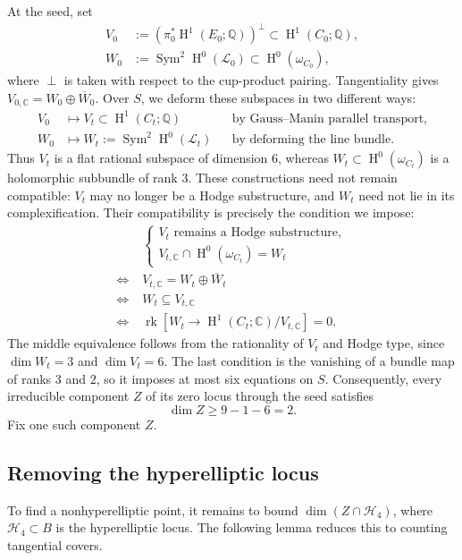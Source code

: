 \documentclass{amsart}
\DeclareMathOperator{\Sym}{Sym}
\DeclareMathOperator{\Hnm}{H}
\DeclareMathOperator{\rk}{rk}
\begin{document}
At the seed, set
$$
\begin{aligned}
V_0&:=\left(\pi_0^*\Hnm^1(E_0;\mathbb{Q})\right)^\perp
\subset\Hnm^1(C_0;\mathbb{Q}),\\
W_0&:=\Sym^2\Hnm^0(\mathcal{L}_0)\subset\Hnm^0(\omega_{C_0}),
\end{aligned}
$$
where $\perp$ is taken with respect to the cup-product pairing.
Tangentiality gives $V_{0,\mathbb{C}}=W_0\oplus\overline{W}_0$.
Over $S$, we deform these subspaces in two different ways:
$$
\begin{aligned}
V_0&\longmapsto V_t\subset\Hnm^1(C_t;\mathbb{Q})
&&\text{by Gauss--Manin parallel transport},\\
W_0&\longmapsto W_t:=\Sym^2\Hnm^0(\mathcal{L}_t)
&&\text{by deforming the line bundle}.
\end{aligned}
$$
Thus $V_t$ is a flat rational subspace of dimension $6$, whereas
$W_t\subset\Hnm^0(\omega_{C_t})$ is a holomorphic subbundle of rank $3$.
These constructions need not remain compatible: $V_t$ may no longer be
a Hodge substructure, and $W_t$ need not lie in its complexification.
Their compatibility is precisely the condition we impose:
$$
\begin{aligned}
&\begin{cases}
V_t\text{ remains a Hodge substructure},\\
V_{t,\mathbb{C}}\cap\Hnm^0(\omega_{C_t})=W_t
\end{cases}\\
\Longleftrightarrow\;& V_{t,\mathbb{C}}=W_t\oplus\overline{W}_t\\
\Longleftrightarrow\;& W_t\subseteq V_{t,\mathbb{C}}\\
\Longleftrightarrow\;&
\rk\left[W_t\longrightarrow\Hnm^1(C_t;\mathbb{C})/V_{t,\mathbb{C}}\right]=0.
\end{aligned}
$$
The middle equivalence follows from the rationality of $V_t$ and Hodge type,
since $\dim W_t=3$ and $\dim V_t=6$. The last condition is the vanishing
of a bundle map of ranks $3$ and $2$, so it imposes at most six equations
on $S$. Consequently, every irreducible component $Z$ of its zero locus
through the seed satisfies
$$
\dim Z\geqslant9-1-6=2.
$$
Fix one such component $Z$.

\subsection{Removing the hyperelliptic locus}\label{subsec:hyperelliptic}

To find a nonhyperelliptic point, it remains to bound
$\dim\left(Z\cap\mathcal{H}_4\right)$, where $\mathcal{H}_4\subset B$
is the hyperelliptic locus. The following lemma reduces this to counting
tangential covers.
\end{document}
